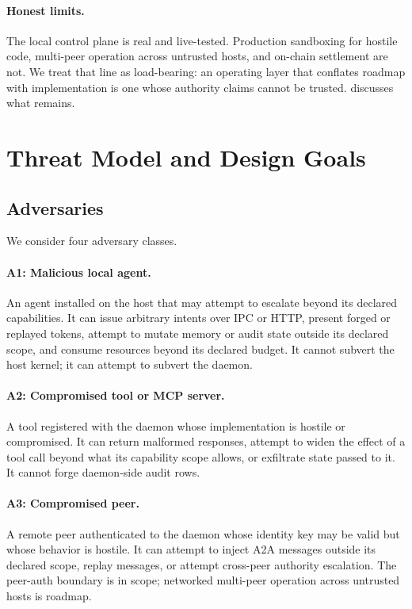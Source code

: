 \documentclass[11pt]{article}
\theoremstyle{plainsmall}
\begin{document}
\paragraph{Honest limits.} The local control plane is real and live-tested. Production sandboxing for hostile code, multi-peer operation across untrusted hosts, and on-chain settlement are not. We treat that line as load-bearing: an operating layer that conflates roadmap with implementation is one whose authority claims cannot be trusted.  discusses what remains.

\section{Threat Model and Design Goals}
\label{sec:threat}

\subsection{Adversaries}
\label{ssec:adversaries}

We consider four adversary classes.

\paragraph{A1: Malicious local agent.} An agent installed on the host that may attempt to escalate beyond its declared capabilities. It can issue arbitrary intents over IPC or HTTP, present forged or replayed tokens, attempt to mutate memory or audit state outside its declared scope, and consume resources beyond its declared budget. It cannot subvert the host kernel; it can attempt to subvert the daemon.

\paragraph{A2: Compromised tool or MCP server.} A tool registered with the daemon whose implementation is hostile or compromised. It can return malformed responses, attempt to widen the effect of a tool call beyond what its capability scope allows, or exfiltrate state passed to it. It cannot forge daemon-side audit rows.

\paragraph{A3: Compromised peer.} A remote peer authenticated to the daemon whose identity key may be valid but whose behavior is hostile. It can attempt to inject A2A messages outside its declared scope, replay messages, or attempt cross-peer authority escalation. The peer-auth boundary is in scope; networked multi-peer operation across untrusted hosts is roadmap.
\end{document}
